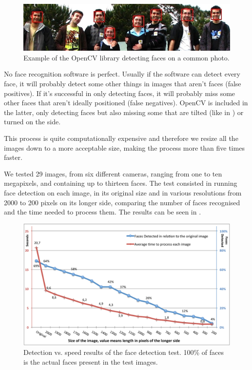\begin{figure}[ht]
	\centering
		\includegraphics[width=\columnwidth]{Figures/faces1.jpg}
	\caption{Example of the OpenCV library detecting faces on a common photo.}
	\label{fig:faces1}
\end{figure}

No face recognition software is perfect. Usually if the software can detect every face, it will probably detect some other things in images that aren't faces (false positives). If it’s successful in only detecting faces, it will probably miss some other faces that aren't ideally positioned (false negatives). OpenCV is included in the latter, only detecting faces but also missing some that are tilted (like in ) or turned on the side.


This process is quite computationally expensive and therefore we resize all the images down to a more acceptable size, making the process more than five times faster.

We tested 29 images, from six different cameras, ranging from one to ten megapixels, and containing up to thirteen faces. The test consisted in running face detection on each image, in its original size and in various resolutions from 2000 to 200 pixels on its longer side, comparing the number of faces recognised and the time needed to process them. The results can be seen in .

\begin{figure}[ht]
	\centering
		\includegraphics[width=\columnwidth]{Figures/graph2.pdf}
	\caption[Detection vs. speed results of the face detection test.]{Detection vs. speed results of the face detection test. 100\% of faces is the actual faces present in the test images.}
	\label{fig:fdres}
\end{figure}


